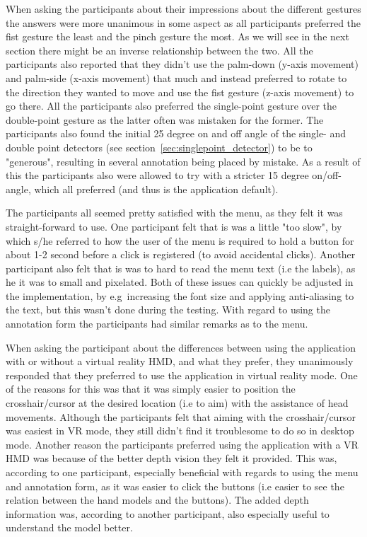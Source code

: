 When asking the participants about their impressions about the different gestures the answers were more unanimous in some aspect
as all participants preferred the fist gesture the least and the pinch gesture the most. As we will see in the next section there might be an inverse relationship between the two.
All the participants also reported that they didn't use the palm-down (y-axis movement) and palm-side (x-axis movement) that much and instead preferred to rotate to the 
direction they wanted to move and use the fist gesture (z-axis movement) to go there. All the participants also preferred the single-point gesture over the double-point gesture as 
the latter often was mistaken for the former. The participants also found the initial 25 degree on and off angle of the single- and double point detectors 
(see section~\vref{sec:singlepoint_detector}) to be to "generous", resulting in several annotation being placed by mistake. 
As a result of this the participants also were allowed to try with a stricter 15 degree on/off-angle, which all preferred (and thus is the application default).

The participants all seemed pretty satisfied with the menu, as they felt it was straight-forward to use. One participant felt that is was a little "too slow", by which
s/he referred to how the user of the menu is required to hold a button for about 1-2 second before a click is registered (to avoid accidental clicks).
Another participant also felt that is was to hard to read the menu text (i.e the labels), as he it was to small and pixelated. Both of these issues 
can quickly be adjusted in the implementation, by e.g~increasing the font size and applying anti-aliasing to the text, but this wasn't done during the testing.
With regard to using the annotation form the participants had similar remarks as to the menu. 

When asking the participant about the differences between using the application with or without a virtual reality HMD, and what they prefer, they unanimously responded
that they preferred to use the application in virtual reality mode. One of the reasons for this was that it was simply easier to position the crosshair/cursor at the 
desired location (i.e to aim) with the assistance of head movements. Although the participants felt that aiming with the crosshair/cursor was easiest in VR mode, they still 
didn't find it troublesome to do so in desktop mode. Another reason the participants preferred using the application with a VR HMD was because of the 
better depth vision they felt it provided. This was, according to one participant, especially beneficial with regards to using the menu and annotation form, as it 
was easier to click the buttons (i.e easier to see the relation between the hand models and the buttons). The added depth information was, according to another participant, 
also especially useful to understand the model better. 

